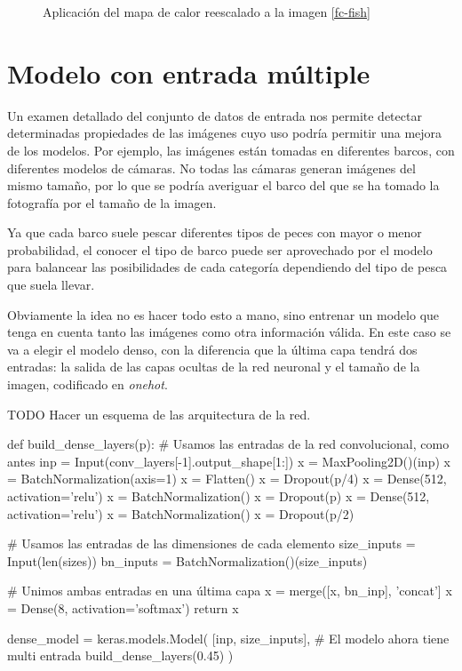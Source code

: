 \begin{figure}
    \caption{Aplicación del mapa de calor reescalado a la imagen \ref{fc-fish}}
\label{yft-heatmap}
\end{figure}

\section{Modelo con entrada múltiple}

Un examen detallado del conjunto de datos de entrada nos permite detectar determinadas propiedades de las imágenes cuyo uso podría permitir una mejora de los modelos. Por ejemplo, las imágenes están tomadas en diferentes barcos, con diferentes modelos de cámaras. No todas las cámaras generan imágenes del mismo tamaño, por lo que se podría averiguar el barco del que se ha tomado la fotografía por el tamaño de la imagen.

Ya que cada barco suele pescar diferentes tipos de peces con mayor o menor probabilidad, el conocer el tipo de barco puede ser aprovechado por el modelo para balancear las posibilidades de cada categoría dependiendo del tipo de pesca que suela llevar.

Obviamente la idea no es hacer todo esto a mano, sino entrenar un modelo que tenga en cuenta tanto las imágenes como otra información válida. En este caso se va a elegir el modelo denso, con la diferencia que la última capa tendrá dos entradas: la salida de las capas ocultas de la red neuronal y el tamaño de la imagen, codificado en \textit{onehot}.

TODO Hacer un esquema de las arquitectura de la red.

\begin{python}
def build_dense_layers(p):
    # Usamos las entradas de la red convolucional, como antes
    inp = Input(conv_layers[-1].output_shape[1:])
    x = MaxPooling2D()(inp)
    x = BatchNormalization(axis=1)
    x = Flatten()
    x = Dropout(p/4)
    x = Dense(512, activation='relu')
    x = BatchNormalization()
    x = Dropout(p)
    x = Dense(512, activation='relu')
    x = BatchNormalization()
    x = Dropout(p/2)

    # Usamos las entradas de las dimensiones de cada elemento
    size_inputs = Input(len(sizes))
    bn_inputs = BatchNormalization()(size_inputs)

    # Unimos ambas entradas en una última capa
    x = merge([x, bn_inp], 'concat']
    x = Dense(8, activation='softmax')
    return x

dense_model = keras.models.Model(
    [inp, size_inputs],  # El modelo ahora tiene multi entrada
    build_dense_layers(0.45)
)
\end{python}

